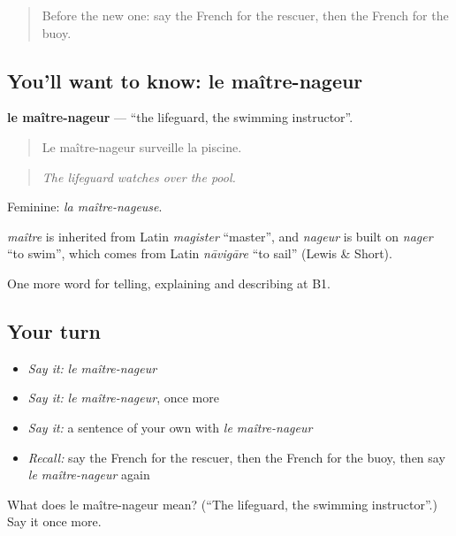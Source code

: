 \label{lesson:FR-C304-maitre-nageur}



\begin{quote}
Before the new one: say the French for the rescuer, then the French for the buoy.
\end{quote}

\subsection*{You'll want to know: le maître-nageur}
\textbf{le maître-nageur} — \textquotedblleft{}the lifeguard, the swimming instructor\textquotedblright{}.

\begin{quote}
Le maître-nageur surveille la piscine.
\end{quote}

\begin{quote}
\emph{The lifeguard watches over the pool.}
\end{quote}

Feminine: \emph{la maître-nageuse}.

\begin{cousinweb}
\emph{maître} is inherited from Latin \emph{magister} \textquotedblleft{}master\textquotedblright{}, and \emph{nageur} is built on \emph{nager} \textquotedblleft{}to swim\textquotedblright{}, which comes from Latin \emph{nāvigāre} \textquotedblleft{}to sail\textquotedblright{} (Lewis \& Short).
\end{cousinweb}

\begin{grammarlens}[title={What you've built}]
One more word for telling, explaining and describing at B1.
\end{grammarlens}

\subsection*{Your turn}
\begin{itemize}
\raggedright
  \item \emph{Say it:} \emph{le maître-nageur}
  \item \emph{Say it:} \emph{le maître-nageur}, once more
  \item \emph{Say it:} a sentence of your own with \emph{le maître-nageur}
  \item \emph{Recall:} say the French for the rescuer, then the French for the buoy, then say \emph{le maître-nageur} again
\end{itemize}

\begin{tcolorbox}[breakable,colback=teal!4,colframe=teal!35!black,title={Before you move on}]
What does le maître-nageur mean? (\textquotedblleft{}The lifeguard, the swimming instructor\textquotedblright{}.) Say it once more.
\end{tcolorbox}
